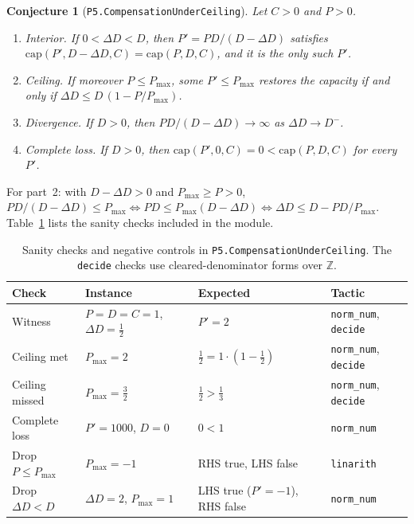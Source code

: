 \documentclass[11pt]{article}
\newtheorem{conjecture}{Conjecture}
\theoremstyle{remark}
\begin{document}
\begin{conjecture}[\texttt{P5.CompensationUnderCeiling}]
Let $C>0$ and $P>0$.
\begin{enumerate}
\item \emph{Interior.} If $0<\Delta D<D$, then $P'=PD/(D-\Delta D)$ satisfies
  $\mathrm{cap}(P',D-\Delta D,C)=\mathrm{cap}(P,D,C)$, and it is the only such $P'$.
\item \emph{Ceiling.} If moreover $P\le P_{\max}$, some $P'\le P_{\max}$ restores the capacity
  if and only if $\Delta D\le D\,(1-P/P_{\max})$.
\item \emph{Divergence.} If $D>0$, then $PD/(D-\Delta D)\to\infty$ as $\Delta D\to D^{-}$.
\item \emph{Complete loss.} If $D>0$, then $\mathrm{cap}(P',0,C)=0<\mathrm{cap}(P,D,C)$ for
  every $P'$.
\end{enumerate}
\end{conjecture}
\noindent For part~2: with $D-\Delta D>0$ and $P_{\max}\ge P>0$,
$PD/(D-\Delta D)\le P_{\max}\iff PD\le P_{\max}(D-\Delta D)\iff \Delta D\le D-PD/P_{\max}$.
Table~\ref{tab:checks} lists the sanity checks included in the module.

\begin{table}[h]
\centering
\small\begin{tabular}{@{}llll@{}}
\toprule
Check & Instance & Expected & Tactic \\
\midrule
Witness & $P=D=C=1$, $\Delta D=\tfrac12$ & $P'=2$ & \texttt{norm\_num}, \texttt{decide}\\
Ceiling met & $P_{\max}=2$ & $\tfrac12=1\cdot(1-\tfrac12)$ & \texttt{norm\_num}, \texttt{decide}\\
Ceiling missed & $P_{\max}=\tfrac32$ & $\tfrac12>\tfrac13$ & \texttt{norm\_num}, \texttt{decide}\\
Complete loss & $P'=1000$, $D=0$ & $0<1$ & \texttt{norm\_num}\\
Drop $P\le P_{\max}$ & $P_{\max}=-1$ & RHS true, LHS false & \texttt{linarith}\\
Drop $\Delta D<D$ & $\Delta D=2$, $P_{\max}=1$ & LHS true ($P'=-1$), RHS false & \texttt{norm\_num}\\
\bottomrule
\end{tabular}
\caption{Sanity checks and negative controls in \texttt{P5.CompensationUnderCeiling}. The \texttt{decide} checks use cleared-denominator forms over $\mathbb{Z}$.}
\label{tab:checks}
\end{table}
\end{document}
